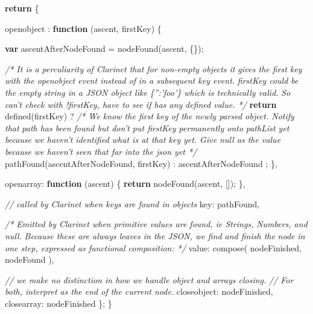 \documentclass[12pt, ]{article}
\newenvironment{Shaded}{}{}
\newcommand{\KeywordTok}[1]{\textcolor[rgb]{0.00,0.44,0.13}{\textbf{{#1}}}}
\newcommand{\DataTypeTok}[1]{\textcolor[rgb]{0.56,0.13,0.00}{{#1}}}
\newcommand{\CommentTok}[1]{\textcolor[rgb]{0.38,0.63,0.69}{\textit{{#1}}}}
\newcommand{\FunctionTok}[1]{\textcolor[rgb]{0.02,0.16,0.49}{{#1}}}
\newcommand{\NormalTok}[1]{{#1}}
\begin{document}
\begin{Shaded}
\begin{Highlighting}[]
   \KeywordTok{return} \NormalTok{\{ }

      \DataTypeTok{openobject }\NormalTok{: }\KeywordTok{function} \NormalTok{(ascent, firstKey) \{}

         \KeywordTok{var} \NormalTok{ascentAfterNodeFound = }\FunctionTok{nodeFound}\NormalTok{(ascent, \{\});         }

         \CommentTok{/* It is a perculiarity of Clarinet that for non-empty objects it}
\CommentTok{            gives the first key with the openobject event instead of}
\CommentTok{            in a subsequent key event.}
\CommentTok{                      }
\CommentTok{            firstKey could be the empty string in a JSON object like }
\CommentTok{            \{'':'foo'\} which is technically valid.}
\CommentTok{            }
\CommentTok{            So can't check with !firstKey, have to see if has any }
\CommentTok{            defined value. */}
         \KeywordTok{return} \FunctionTok{defined}\NormalTok{(firstKey)}
         \NormalTok{?          }
            \CommentTok{/* We know the first key of the newly parsed object. Notify that }
\CommentTok{               path has been found but don't put firstKey permanently onto }
\CommentTok{               pathList yet because we haven't identified what is at that key }
\CommentTok{               yet. Give null as the value because we haven't seen that far }
\CommentTok{               into the json yet */}
            \FunctionTok{pathFound}\NormalTok{(ascentAfterNodeFound, firstKey)}
         \NormalTok{:}
            \NormalTok{ascentAfterNodeFound}
         \NormalTok{;}
      \NormalTok{\},}
    
      \DataTypeTok{openarray}\NormalTok{: }\KeywordTok{function} \NormalTok{(ascent) \{}
         \KeywordTok{return} \FunctionTok{nodeFound}\NormalTok{(ascent, []);}
      \NormalTok{\},}

      \CommentTok{// called by Clarinet when keys are found in objects               }
      \DataTypeTok{key}\NormalTok{: pathFound,}
      
      \CommentTok{/* Emitted by Clarinet when primitive values are found, ie Strings,}
\CommentTok{         Numbers, and null.}
\CommentTok{         Because these are always leaves in the JSON, we find and finish the }
\CommentTok{         node in one step, expressed as functional composition: */}
      \DataTypeTok{value}\NormalTok{: }\FunctionTok{compose}\NormalTok{( nodeFinished, nodeFound ),}
      
      \CommentTok{// we make no distinction in how we handle object and arrays closing.}
      \CommentTok{// For both, interpret as the end of the current node.}
      \DataTypeTok{closeobject}\NormalTok{: nodeFinished,}
      \DataTypeTok{closearray}\NormalTok{: nodeFinished}
   \NormalTok{\};}
\NormalTok{\}}
\end{Highlighting}
\end{Shaded}
\end{document}
